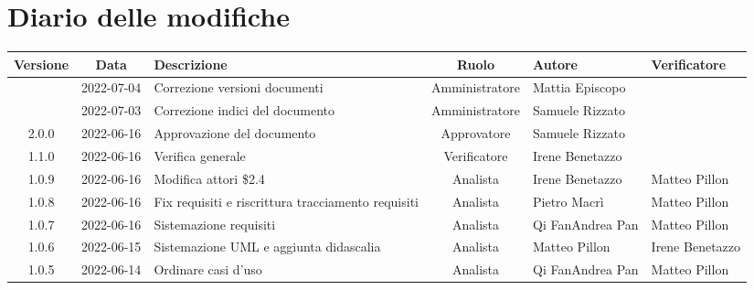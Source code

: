 \section*{Diario delle modifiche}
	\begin{center}
	\renewcommand{\arraystretch}{1.8} %
	\begin{longtable}{ |c|c|p{8em}|c|m{5em}|m{5em}| }
	\hline
	\textbf{Versione} & \textbf{Data} & \textbf{Descrizione} &  \textbf{Ruolo} &  \textbf{Autore} & \textbf{Verificatore}\\ %
	\hline
	& 2022-07-04 & Correzione versioni documenti & Amministratore & Mattia \newline Episcopo & \\
	\hline
	 & 2022-07-03 & Correzione indici del documento & Amministratore & Samuele \newline Rizzato & \\
	\hline
	2.0.0 & 2022-06-16 & Approvazione del documento & Approvatore & Samuele \newline Rizzato & \\
	\hline
	1.1.0 & 2022-06-16 & Verifica generale & Verificatore & Irene \newline Benetazzo & \\
	\hline
	1.0.9 & 2022-06-16 & Modifica attori \$2.4 & Analista & Irene \newline Benetazzo & Matteo \newline Pillon\\
	\hline
	1.0.8 & 2022-06-16 & Fix requisiti e riscrittura tracciamento requisiti & Analista & Pietro \newline Macrì & Matteo \newline Pillon\\
	\hline
	1.0.7 & 2022-06-16 & Sistemazione requisiti & Analista & Qi Fan\newline Andrea Pan & Matteo \newline Pillon\\
	\hline
	1.0.6 & 2022-06-15 & Sistemazione UML \newline e aggiunta didascalia  & Analista & Matteo \newline Pillon & Irene \newline Benetazzo \\
	\hline
	1.0.5 & 2022-06-14 & Ordinare casi d'uso  & Analista & Qi Fan\newline Andrea Pan & Matteo \newline Pillon \\

\end{longtable}
\end{center}
